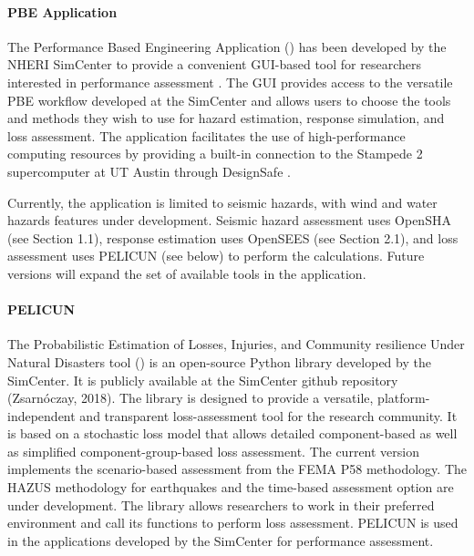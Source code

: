 \paragraph{PBE Application} The Performance Based Engineering Application () has been developed by the NHERI SimCenter to provide a convenient GUI-based tool for researchers interested in performance assessment \citep{mckenna2018performance}. The GUI provides access to the versatile PBE workflow developed at the SimCenter and allows users to choose the tools and methods they wish to use for hazard estimation, response simulation, and loss assessment. The application facilitates the use of high-performance computing resources by providing a built-in connection to the Stampede 2 supercomputer at UT Austin through DesignSafe \citep{rathje2017designsafe}.

Currently, the application is limited to seismic hazards, with wind and water hazards features under development. Seismic hazard assessment uses OpenSHA (see Section 1.1), response estimation uses OpenSEES (see Section 2.1), and loss assessment uses PELICUN (see below) to perform the calculations. Future versions will expand the set of available tools in the application.

\paragraph{PELICUN} The Probabilistic Estimation of Losses, Injuries, and Community resilience Under Natural Disasters tool () is an open-source Python library developed by the SimCenter. It is publicly available at the SimCenter github repository (Zsarnóczay, 2018). The library is designed to provide a versatile, platform-independent and transparent loss-assessment tool for the research community. It is based on a stochastic loss model that allows detailed component-based as well as simplified component-group-based loss assessment. The current version implements the scenario-based assessment from the FEMA P58 methodology. The HAZUS methodology for earthquakes and the time-based assessment option are under development. The library allows researchers to work in their preferred environment and call its functions to perform loss assessment. PELICUN is used in the applications developed by the SimCenter for performance assessment.

